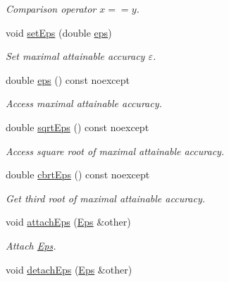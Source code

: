 \begin{DoxyCompactItemize}
\begin{DoxyCompactList}\small\item\em Comparison operator $ x==y$. \end{DoxyCompactList}\item 
void \hyperlink{classSpacy_1_1Mixin_1_1Eps_a1bbfd62541610d5d80f2782ab77158e4_a1bbfd62541610d5d80f2782ab77158e4}{set\+Eps} (double \hyperlink{classSpacy_1_1Mixin_1_1Eps_a40e2ba8f3abd2b5370ef41238cfaaf8b_a40e2ba8f3abd2b5370ef41238cfaaf8b}{eps})
\begin{DoxyCompactList}\small\item\em Set maximal attainable accuracy $\varepsilon$. \end{DoxyCompactList}\item 
double \hyperlink{classSpacy_1_1Mixin_1_1Eps_a40e2ba8f3abd2b5370ef41238cfaaf8b_a40e2ba8f3abd2b5370ef41238cfaaf8b}{eps} () const noexcept
\begin{DoxyCompactList}\small\item\em Access maximal attainable accuracy. \end{DoxyCompactList}\item 
double \hyperlink{classSpacy_1_1Mixin_1_1Eps_a29e8c25dc3f1fdede57b8eb06f520fe1_a29e8c25dc3f1fdede57b8eb06f520fe1}{sqrt\+Eps} () const noexcept
\begin{DoxyCompactList}\small\item\em Access square root of maximal attainable accuracy. \end{DoxyCompactList}\item 
double \hyperlink{classSpacy_1_1Mixin_1_1Eps_a1879ebbf1b467cb4be36bcc63307018d_a1879ebbf1b467cb4be36bcc63307018d}{cbrt\+Eps} () const noexcept
\begin{DoxyCompactList}\small\item\em Get third root of maximal attainable accuracy. \end{DoxyCompactList}\item 
void \hyperlink{classSpacy_1_1Mixin_1_1Eps_af69cd3dee52e723302b21ca2a25f1192_af69cd3dee52e723302b21ca2a25f1192}{attach\+Eps} (\hyperlink{classSpacy_1_1Mixin_1_1Eps_a51dbe0b9cc950e0f3dfd34a481f08ae4_a51dbe0b9cc950e0f3dfd34a481f08ae4}{Eps} \&other)
\begin{DoxyCompactList}\small\item\em Attach \hyperlink{classSpacy_1_1Mixin_1_1Eps}{Eps}. \end{DoxyCompactList}\item 
\hypertarget{classSpacy_1_1Mixin_1_1Eps_ab49910e189cb86b6fd6f89b6f2af14cc}{}void \hyperlink{classSpacy_1_1Mixin_1_1Eps_ab49910e189cb86b6fd6f89b6f2af14cc}{detach\+Eps} (\hyperlink{classSpacy_1_1Mixin_1_1Eps_a51dbe0b9cc950e0f3dfd34a481f08ae4_a51dbe0b9cc950e0f3dfd34a481f08ae4}{Eps} \&other)\label{classSpacy_1_1Mixin_1_1Eps_ab49910e189cb86b6fd6f89b6f2af14cc}


\end{DoxyCompactItemize}
